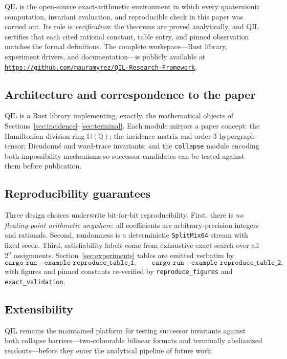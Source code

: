 \documentclass[pdflatex,sn-mathphys-num]{sn-jnl}
\theoremstyle{thmstyleone}%
\theoremstyle{thmstyletwo}%
\theoremstyle{thmstylethree}%
\newcommand{\HH}{\mathbb{H}}
\newcommand{\QQ}{\mathbb{Q}}
\newcommand{\QILRepositoryURL}{https://github.com/mauramyrez/QIL-Research-Framework}
\begin{document}
QIL is the open-source exact-arithmetic environment in which every
quaternionic computation, invariant evaluation, and reproducible check in
this paper was carried out. Its role is \emph{verification}: the theorems are
proved analytically, and QIL certifies that each cited rational constant,
table entry, and pinned observation matches the formal definitions. The
complete workspace---Rust library, experiment drivers, and
documentation---is publicly available at
\href{\QILRepositoryURL}{\nolinkurl{\QILRepositoryURL}}.

\subsection{Architecture and correspondence to the paper}

QIL is a Rust library implementing, exactly, the mathematical objects of
Sections~\ref{sec:incidence}--\ref{sec:terminal}. Each module mirrors a paper
concept: the Hamiltonian division ring $\HH(\QQ)$; the incidence matrix and
order-$3$ hypergraph tensor; Dieudonn\'e and word-trace invariants; and the
\texttt{collapse} module encoding both impossibility mechanisms so successor
candidates can be tested against them before publication.

\subsection{Reproducibility guarantees}

Three design choices underwrite bit-for-bit reproducibility. First, there is
\emph{no floating-point arithmetic anywhere}: all coefficients are
arbitrary-precision integers and rationals. Second, randomness is a
deterministic \texttt{SplitMix64} stream with fixed seeds. Third,
satisfiability labels come from exhaustive exact search over all $2^n$
assignments. Section~\ref{sec:experiments} tables are emitted verbatim by
\[
  \texttt{cargo run -{}-example reproduce\_table\_1},\qquad
  \texttt{cargo run -{}-example reproduce\_table\_2},
\]
with figures and pinned constants re-verified by
\texttt{reproduce\_figures} and \texttt{exact\_validation}.

\subsection{Extensibility}

QIL remains the maintained platform for testing successor invariants against
both collapse barriers---two-colourable bilinear formats and terminally
abelianized readouts---before they enter the analytical pipeline of future
work.
\end{document}
